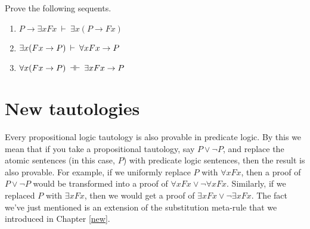                                                  
\begin{exercises} Prove the following sequents.
  \begin{enumerate}


\item $P\to\exists xFx\:\vdash\: \exists x(P\to Fx)$
\item $\exists x(Fx\rightarrow P)\:\vdash\:\forall xFx\to P$
\item $\forall x(Fx\to P)\:\dashv\vdash\: \exists xFx\rightarrow P$
  \end{enumerate}
\end{exercises}



\section{New tautologies}

Every propositional logic tautology is also provable in predicate
logic.  By this we mean that if you take a propositional tautology,
say $P\vee\neg P$, and replace the atomic sentences (in this case,
$P$) with predicate logic sentences, then the result is also provable.
For example, if we uniformly replace $P$ with $\forall xFx$, then a
proof of $P\vee\neg P$ would be transformed into a proof of
$\forall xFx\vee\neg\forall xFx$.  Similarly, if we replaced $P$ with
$\exists xFx$, then we would get a proof of
$\exists xFx\vee\neg\exists xFx$.  The fact we've just mentioned is an
extension of the substitution meta-rule that we introduced in Chapter
\ref{new}.

